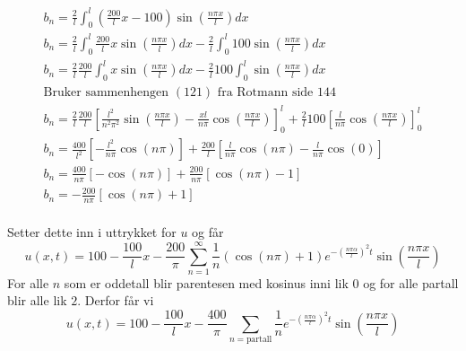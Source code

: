 \documentclass[11pt, A4paper,norsk]{article}
\begin{document}
				\begin{gather*}
b_n = \frac{2}{l} \int_{0}^{l} \left( \frac{200}{l}x - 100 \right) \sin\left( \frac{n \pi x}{l} \right) dx \\
b_n = \frac{2}{l} \int_{0}^{l} \frac{200}{l}x \sin\left( \frac{n \pi x}{l} \right) dx - \frac{2}{l} \int_{0}^{l} 100 \sin\left( \frac{n \pi x}{l} \right) dx \\
b_n = \frac{2}{l} \frac{200}{l} \int_{0}^{l} x \sin\left( \frac{n \pi x}{l} \right) dx - \frac{2}{l} 100 \int_{0}^{l} \sin\left( \frac{n \pi x}{l} \right) dx \\
\text{Bruker sammenhengen $(121)$ fra Rotmann side $144$} \\
b_n = \frac{2}{l} \frac{200}{l}\left[ \frac{l^2}{n^2 \pi^2} \sin\left( \frac{n \pi x}{l} \right) - \frac{x l}{n \pi} \cos\left( \frac{n \pi x}{l} \right) \right]_{0}^{l} + \frac{2}{l} 100 \left[ \frac{l}{n \pi} \cos\left( \frac{n \pi x}{l} \right) \right]_{0}^{l} \\
b_n = \frac{400}{l^2} \left[ - \frac{l^2}{n \pi} \cos\left( n \pi \right) \right] + \frac{200}{l} \left[ \frac{l}{n \pi} \cos( n \pi ) - \frac{l}{n \pi} \cos(0) \right] \\
b_n = \frac{400}{n \pi} \left[ - \cos\left( n \pi \right) \right] + \frac{200}{n \pi} \left[ \cos( n \pi ) - 1 \right] \\
b_n = - \frac{200}{n \pi} \left[ \cos\left( n \pi \right) + 1 \right] \\
				\end{gather*}
				\begin{flushleft}
Setter dette inn i uttrykket for $u$ og får
$$u(x, t) = 100 - \frac{100}{l}x - \frac{200}{\pi} \sum_{n = 1}^{\infty} \frac{1}{n} \left( \cos\left( n \pi \right) + 1 \right) e^{- \left( \frac{n \pi \alpha}{l} \right)^2 t} \sin\left( \frac{n \pi x}{l} \right)$$
For alle $n$ som er oddetall blir parentesen med kosinus inni lik $0$ og for alle partall blir alle lik $2$. Derfor får vi
$$u(x, t) = 100 - \frac{100}{l}x - \frac{400}{\pi} \sum_{n = \text{partall}} \frac{1}{n} e^{- \left( \frac{n \pi \alpha}{l} \right)^2 t} \sin\left( \frac{n \pi x}{l} \right)$$
				\end{flushleft}
\end{document}
